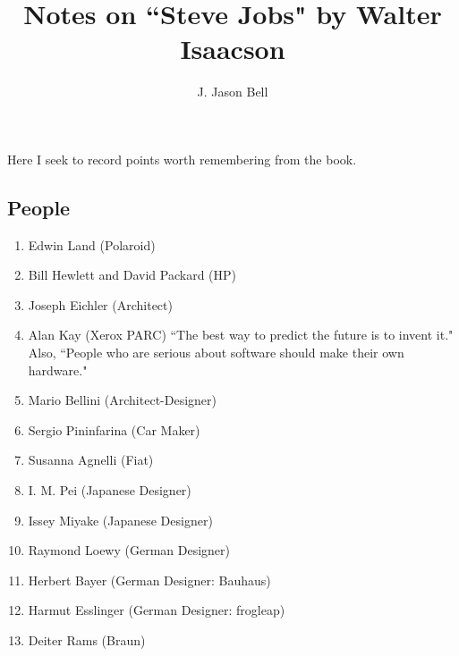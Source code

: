 \documentclass[11pt, oneside]{article}   	%
\title{Notes on ``Steve Jobs" by Walter Isaacson}
\author{J. Jason Bell}
\begin{document}
 \maketitle

Here I seek to record points worth remembering from the book.  %

\subsection{People}
\begin{enumerate}
\item Edwin Land (Polaroid)
\item Bill Hewlett and David Packard (HP)
\item Joseph Eichler (Architect) 
\item Alan Kay (Xerox PARC) ``The best way to predict the future is to invent it."  Also, ``People who are serious about software should make their own hardware."
\item Mario Bellini (Architect-Designer)
\item Sergio Pininfarina (Car Maker)
\item Susanna Agnelli (Fiat)
\item I. M. Pei (Japanese Designer)
\item Issey Miyake (Japanese Designer)
\item Raymond Loewy (German Designer)
\item Herbert Bayer (German Designer: Bauhaus)
\item Harmut Esslinger (German Designer: frogleap)
\item Deiter Rams (Braun)
\end{enumerate}
\end{document}
